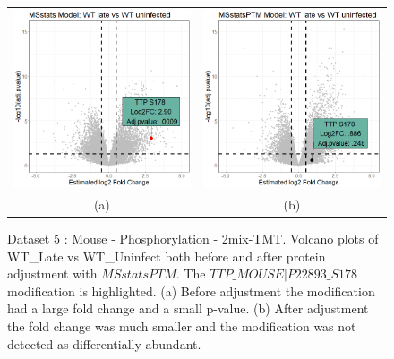 \documentclass{mcp}
\begin{document}
\begin{figure}[ht]
\centering
 \begin{tabular}{cc}
	\includegraphics[width=.475\textwidth]{sim_new/SuppFigure7a.png}
	&
	\includegraphics[width=.475\textwidth]{sim_new/SuppFigure7b.png}\\
	(a)&(b)
\end{tabular}
\caption{Dataset 5 : Mouse - Phosphorylation - 2mix-TMT. Volcano plots of WT\_Late vs WT\_Uninfect both before and after protein adjustment with $MSstatsPTM$. The $TTP\_MOUSE|P22893\_S178$ modification is highlighted. (a) Before adjustment the modification had a large fold change and a small p-value. (b) After adjustment the fold change was much smaller and the modification was not detected as differentially abundant.}

\label{fig:No_Diff_Shigella_PTM}
\end{figure}
\end{document}
